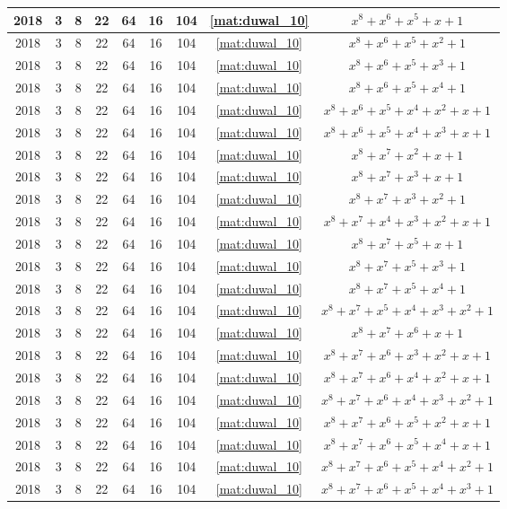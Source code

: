 \begin{longtable}{|c|c|c|c|c|c|c|c|c|}
2018 & 3 & 8 & 22 & 64 & 16 & 104 & \eqref{mat:duwal_10} & $x^8 + x^6 + x^5 + x + 1$ \\ \hline 
2018 & 3 & 8 & 22 & 64 & 16 & 104 & \eqref{mat:duwal_10} & $x^8 + x^6 + x^5 + x^2 + 1$ \\ \hline 
2018 & 3 & 8 & 22 & 64 & 16 & 104 & \eqref{mat:duwal_10} & $x^8 + x^6 + x^5 + x^3 + 1$ \\ \hline 
2018 & 3 & 8 & 22 & 64 & 16 & 104 & \eqref{mat:duwal_10} & $x^8 + x^6 + x^5 + x^4 + 1$ \\ \hline 
2018 & 3 & 8 & 22 & 64 & 16 & 104 & \eqref{mat:duwal_10} & $x^8 + x^6 + x^5 + x^4 + x^2 + x + 1$ \\ \hline 
2018 & 3 & 8 & 22 & 64 & 16 & 104 & \eqref{mat:duwal_10} & $x^8 + x^6 + x^5 + x^4 + x^3 + x + 1$ \\ \hline 
2018 & 3 & 8 & 22 & 64 & 16 & 104 & \eqref{mat:duwal_10} & $x^8 + x^7 + x^2 + x + 1$ \\ \hline 
2018 & 3 & 8 & 22 & 64 & 16 & 104 & \eqref{mat:duwal_10} & $x^8 + x^7 + x^3 + x + 1$ \\ \hline 
2018 & 3 & 8 & 22 & 64 & 16 & 104 & \eqref{mat:duwal_10} & $x^8 + x^7 + x^3 + x^2 + 1$ \\ \hline 
2018 & 3 & 8 & 22 & 64 & 16 & 104 & \eqref{mat:duwal_10} & $x^8 + x^7 + x^4 + x^3 + x^2 + x + 1$ \\ \hline 
2018 & 3 & 8 & 22 & 64 & 16 & 104 & \eqref{mat:duwal_10} & $x^8 + x^7 + x^5 + x + 1$ \\ \hline 
2018 & 3 & 8 & 22 & 64 & 16 & 104 & \eqref{mat:duwal_10} & $x^8 + x^7 + x^5 + x^3 + 1$ \\ \hline 
2018 & 3 & 8 & 22 & 64 & 16 & 104 & \eqref{mat:duwal_10} & $x^8 + x^7 + x^5 + x^4 + 1$ \\ \hline 
2018 & 3 & 8 & 22 & 64 & 16 & 104 & \eqref{mat:duwal_10} & $x^8 + x^7 + x^5 + x^4 + x^3 + x^2 + 1$ \\ \hline 
2018 & 3 & 8 & 22 & 64 & 16 & 104 & \eqref{mat:duwal_10} & $x^8 + x^7 + x^6 + x + 1$ \\ \hline 
2018 & 3 & 8 & 22 & 64 & 16 & 104 & \eqref{mat:duwal_10} & $x^8 + x^7 + x^6 + x^3 + x^2 + x + 1$ \\ \hline 
2018 & 3 & 8 & 22 & 64 & 16 & 104 & \eqref{mat:duwal_10} & $x^8 + x^7 + x^6 + x^4 + x^2 + x + 1$ \\ \hline 
2018 & 3 & 8 & 22 & 64 & 16 & 104 & \eqref{mat:duwal_10} & $x^8 + x^7 + x^6 + x^4 + x^3 + x^2 + 1$ \\ \hline 
2018 & 3 & 8 & 22 & 64 & 16 & 104 & \eqref{mat:duwal_10} & $x^8 + x^7 + x^6 + x^5 + x^2 + x + 1$ \\ \hline 
2018 & 3 & 8 & 22 & 64 & 16 & 104 & \eqref{mat:duwal_10} & $x^8 + x^7 + x^6 + x^5 + x^4 + x + 1$ \\ \hline 
2018 & 3 & 8 & 22 & 64 & 16 & 104 & \eqref{mat:duwal_10} & $x^8 + x^7 + x^6 + x^5 + x^4 + x^2 + 1$ \\ \hline 
2018 & 3 & 8 & 22 & 64 & 16 & 104 & \eqref{mat:duwal_10} & $x^8 + x^7 + x^6 + x^5 + x^4 + x^3 + 1$ \\ \hline 
\end{longtable}

